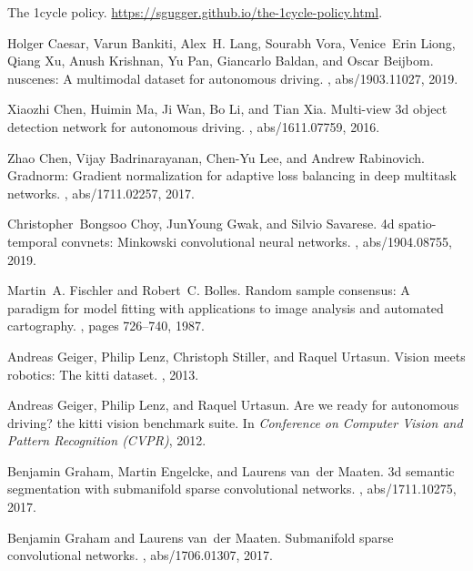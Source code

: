 \documentclass[10pt,twocolumn,letterpaper]{article}
\begin{document}
{\small
\begin{thebibliography}{10}\itemsep=-1pt

The 1cycle policy.
\newblock \url{https://sgugger.github.io/the-1cycle-policy.html}.

Holger Caesar, Varun Bankiti, Alex~H. Lang, Sourabh Vora, Venice~Erin Liong,
  Qiang Xu, Anush Krishnan, Yu Pan, Giancarlo Baldan, and Oscar Beijbom.
\newblock nuscenes: {A} multimodal dataset for autonomous driving.
, abs/1903.11027, 2019.

Xiaozhi Chen, Huimin Ma, Ji Wan, Bo Li, and Tian Xia.
\newblock Multi-view 3d object detection network for autonomous driving.
, abs/1611.07759, 2016.

Zhao Chen, Vijay Badrinarayanan, Chen{-}Yu Lee, and Andrew Rabinovich.
\newblock Gradnorm: Gradient normalization for adaptive loss balancing in deep
  multitask networks.
, abs/1711.02257, 2017.

Christopher~Bongsoo Choy, JunYoung Gwak, and Silvio Savarese.
\newblock 4d spatio-temporal convnets: Minkowski convolutional neural networks.
, abs/1904.08755, 2019.

Martin~A. Fischler and Robert~C. Bolles.
\newblock Random sample consensus: A paradigm for model fitting with
  applications to image analysis and automated cartography.
, pages 726--740, 1987.

Andreas Geiger, Philip Lenz, Christoph Stiller, and Raquel Urtasun.
\newblock Vision meets robotics: The kitti dataset.
, 2013.

Andreas Geiger, Philip Lenz, and Raquel Urtasun.
\newblock Are we ready for autonomous driving? the kitti vision benchmark
  suite.
\newblock In {\em Conference on Computer Vision and Pattern Recognition
  (CVPR)}, 2012.

Benjamin Graham, Martin Engelcke, and Laurens van~der Maaten.
\newblock 3d semantic segmentation with submanifold sparse convolutional
  networks.
, abs/1711.10275, 2017.

Benjamin Graham and Laurens van~der Maaten.
\newblock Submanifold sparse convolutional networks.
, abs/1706.01307, 2017.


\end{thebibliography}}
\end{document}
